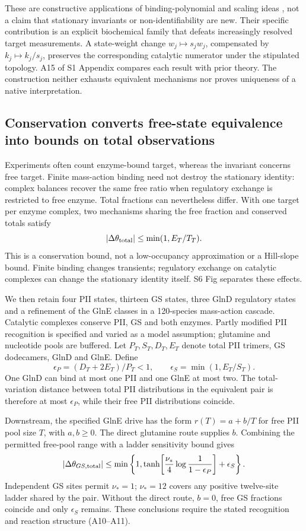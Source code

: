 \documentclass[10pt,letterpaper]{article}
\begin{document}
These are constructive applications of binding-polynomial and scaling ideas \cite{r4,r72,r73}, not a claim that stationary invariants or non-identifiability are new. Their specific contribution is an explicit biochemical family that defeats increasingly resolved target measurements. A state-weight change $w_j\mapsto s_jw_j$, compensated by $k_j\mapsto k_j/s_j$, preserves the corresponding catalytic numerator under the stipulated topology. A15 of S1 Appendix compares each result with prior theory. The construction neither exhausts equivalent mechanisms nor proves uniqueness of a native interpretation.

\subsection*{Conservation converts free-state equivalence into bounds on total observations}

Experiments often count enzyme-bound target, whereas the invariant concerns free target. Finite mass-action binding need not destroy the stationary identity: complex balances recover the same free ratio when regulatory exchange is restricted to free enzyme. Total fractions can nevertheless differ. With one target per enzyme complex, two mechanisms sharing the free fraction and conserved totals satisfy
\[
 |\Delta\theta_{\rm total}|\leq\min(1,E_T/T_T).
\]
This is a conservation bound, not a low-occupancy approximation or a Hill-slope bound. Finite binding changes transients; regulatory exchange on catalytic complexes can change the stationary identity itself. S6 Fig separates these effects.

We then retain four PII states, thirteen GS states, three GlnD regulatory states and a refinement of the GlnE classes in a 120-species mass-action cascade. Catalytic complexes conserve PII, GS and both enzymes. Partly modified PII recognition is specified and varied as a model assumption; glutamine and nucleotide pools are buffered. Let $P_T,S_T,D_T,E_T$ denote total PII trimers, GS dodecamers, GlnD and GlnE. Define
\[
 \epsilon_P=(D_T+2E_T)/P_T<1,\qquad
 \epsilon_S=\min(1,E_T/S_T).
\]
One GlnD can bind at most one PII and one GlnE at most two. The total-variation distance between total PII distributions in the equivalent pair is therefore at most $\epsilon_P$, while their free PII distributions coincide.

Downstream, the specified GlnE drive has the form $r(T)=a+b/T$ for free PII pool size $T$, with $a,b\geq0$. The direct glutamine route supplies $b$. Combining the permitted free-pool range with a ladder sensitivity bound gives
\[
 |\Delta\theta_{GS,\rm total}|\leq
 \min\left\{1,\tanh\!\left[\frac{\nu_*}{4}\log\frac{1}{1-\epsilon_P}\right]+\epsilon_S\right\}.
\]
Independent GS sites permit $\nu_*=1$; $\nu_*=12$ covers any positive twelve-site ladder shared by the pair. Without the direct route, $b=0$, free GS fractions coincide and only $\epsilon_S$ remains. These conclusions require the stated recognition and reaction structure (A10--A11).
\end{document}
